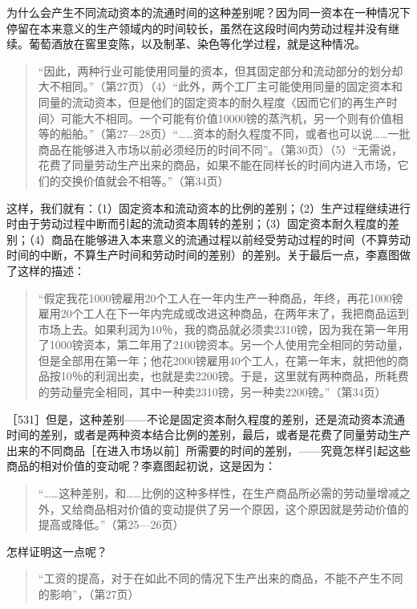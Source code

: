 为什么会产生不同流动资本的流通时间的这种差别呢？因为同一资本在一种情况下停留在本来意义的生产领域内的时间较长，虽然在这段时间内劳动过程并没有继续。葡萄酒放在窖里变陈，以及制革、染色等化学过程，就是这种情况。

\begin{quote}{“因此，两种行业可能使用同量的资本，但其固定部分和流动部分的划分却大不相同。”（第27页）（4）“此外，两个工厂主可能使用同量的固定资本和同量的流动资本，但是他们的固定资本的耐久程度〈因而它们的再生产时间〉可能大不相同。一个可能有价值10000镑的蒸汽机，另一个则有价值相等的船舶。”（第27—28页）“……资本的耐久程度不同，或者也可以说……一批商品在能够进入市场以前必须经历的时间不同”。（第30页）（5）“无需说，花费了同量劳动生产出来的商品，如果不能在同样长的时间内进入市场，它们的交换价值就会不相等。”（第34页）}\end{quote}

这样，我们就有：（1）固定资本和流动资本的比例的差别；（2）生产过程继续进行时由于劳动过程中断而引起的流动资本周转的差别；（3）固定资本耐久程度的差别；（4）商品在能够进入本来意义的流通过程以前经受劳动过程的时间（不算劳动时间的中断，不算生产时间和劳动时间的差别）的差别。关于最后一点，李嘉图做了这样的描述：

\begin{quote}{“假定我花1000镑雇用20个工人在一年内生产一种商品，年终，再花1000镑雇用20个工人在下一年内完成或改进这种商品，在两年末了，我把商品运到市场上去。如果利润为10％，我的商品就必须卖2310镑，因为我在第一年用了1000镑资本，第二年用了2100镑资本。另一个人使用完全相同的劳动量，但是全部用在第一年；他花2000镑雇用40个工人，在第一年末，就把他的商品按10％的利润出卖，也就是卖2200镑。于是，这里就有两种商品，所耗费的劳动量完全相同，其中一种卖2310镑，另一种卖2200镑。”（第34页）}\end{quote}

［531］但是，这种差别——不论是固定资本耐久程度的差别，还是流动资本流通时间的差别，或者是两种资本结合比例的差别，最后，或者是花费了同量劳动生产出来的不同商品［在进入市场以前］所需要的时间的差别，——究竟怎样引起这些商品的相对价值的变动呢？李嘉图起初说，这是因为：

\begin{quote}{“……这种差别，和……比例的这种多样性，在生产商品所必需的劳动量增减之外，又给商品相对价值的变动提供了另一个原因，这个原因就是劳动价值的提高或降低。”（第25—26页）}\end{quote}

怎样证明这一点呢？

\begin{quote}{“工资的提高，对于在如此不同的情况下生产出来的商品，不能不产生不同的影响”，（第27页）}\end{quote}

